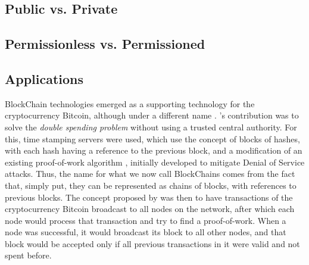 \subsection{Public vs. Private}

\subsection{Permissionless vs. Permissioned}

\subsection{Applications}

BlockChain technologies emerged as a supporting technology for the cryptocurrency Bitcoin, although under a different name \cite{nakamoto_bitcoin:_2008}. \citeauthor{nakamoto_bitcoin:_2008}'s contribution was to solve the \textit{double spending problem} without using a trusted central authority. For this, time stamping servers were used, which use the concept of blocks of hashes, with each hash having a reference to the previous block, and a modification of an existing proof-of-work algorithm \cite{back_hashcash_2002}, initially developed to mitigate Denial of Service attacks. Thus, the name for what we now call BlockChains comes from the fact that, simply put, they can be represented as chains of blocks, with references to previous blocks. The concept proposed by \citeauthor{nakamoto_bitcoin:_2008} was then to have transactions of the cryptocurrency Bitcoin broadcast to all nodes on the network, after which each node would process that transaction and try to find a proof-of-work. When a node was successful, it would broadcast its block to all other nodes, and that block would be accepted only if all previous transactions in it were valid and not spent before.

